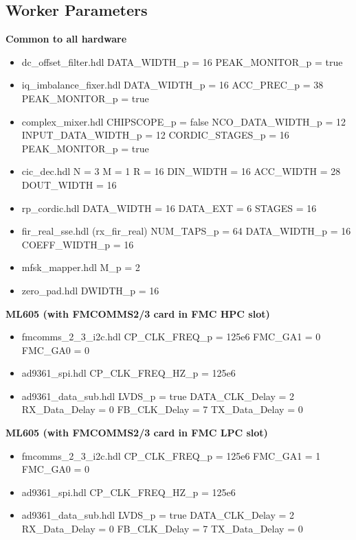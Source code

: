 \begin{appendices}
\section{Worker Parameters}
\label{app:Worker_Parameters}
\begin{minipage}[t]{.5\textwidth}
	\textbf{Common to all hardware}
	\begin{itemize}
		\item dc\_offset\_filter.hdl
			\subitem DATA\_WIDTH\_p = 16
			\subitem PEAK\_MONITOR\_p = true
		\item iq\_imbalance\_fixer.hdl
			\subitem DATA\_WIDTH\_p = 16
			\subitem ACC\_PREC\_p = 38
			\subitem PEAK\_MONITOR\_p = true
		\item complex\_mixer.hdl
			\subitem CHIPSCOPE\_p = false
			\subitem NCO\_DATA\_WIDTH\_p = 12
			\subitem INPUT\_DATA\_WIDTH\_p = 12
			\subitem CORDIC\_STAGES\_p = 16
			\subitem PEAK\_MONITOR\_p = true
		\item cic\_dec.hdl
			\subitem N = 3
			\subitem M = 1
			\subitem R = 16
			\subitem DIN\_WIDTH = 16
			\subitem ACC\_WIDTH = 28
			\subitem DOUT\_WIDTH = 16
		\item rp\_cordic.hdl
			\subitem DATA\_WIDTH = 16
			\subitem DATA\_EXT = 6
			\subitem STAGES = 16
		\item fir\_real\_sse.hdl (rx\_fir\_real)
			\subitem NUM\_TAPS\_p = 64
			\subitem DATA\_WIDTH\_p = 16
			\subitem COEFF\_WIDTH\_p = 16
		\item mfsk\_mapper.hdl
			\subitem M\_p = 2
		\item zero\_pad.hdl
			\subitem DWIDTH\_p = 16
	\end{itemize}
\end{minipage}
\begin{minipage}[t]{.5\textwidth}
	\textbf{ML605 (with FMCOMMS2/3 card in FMC HPC slot)}
	\begin{itemize}
		\item fmcomms\_2\_3\_i2c.hdl
			\subitem CP\_CLK\_FREQ\_p = 125e6
			\subitem FMC\_GA1 = 0
			\subitem FMC\_GA0 = 0
		\item ad9361\_spi.hdl
			\subitem CP\_CLK\_FREQ\_HZ\_p = 125e6
		\item ad9361\_data\_sub.hdl
			\subitem LVDS\_p = true
			\subitem DATA\_CLK\_Delay = 2
			\subitem RX\_Data\_Delay = 0
			\subitem FB\_CLK\_Delay = 7
			\subitem TX\_Data\_Delay = 0
	\end{itemize}
	\textbf{ML605 (with FMCOMMS2/3 card in FMC LPC slot)}
	\begin{itemize}
		\item fmcomms\_2\_3\_i2c.hdl
			\subitem CP\_CLK\_FREQ\_p = 125e6
			\subitem FMC\_GA1 = 1
			\subitem FMC\_GA0 = 0
		\item ad9361\_spi.hdl
			\subitem CP\_CLK\_FREQ\_HZ\_p = 125e6
		\item ad9361\_data\_sub.hdl
			\subitem LVDS\_p = true
			\subitem DATA\_CLK\_Delay = 2
			\subitem RX\_Data\_Delay = 0
			\subitem FB\_CLK\_Delay = 7
			\subitem TX\_Data\_Delay = 0
	\end{itemize}
\end{minipage}


\end{appendices}
